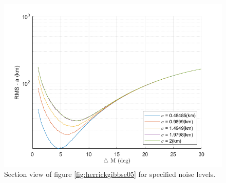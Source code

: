 \documentclass[12pt]{article}
\begin{document}
\begin{figure}[H]
	\centering
	\includegraphics[width=0.7\linewidth]{heck_gibbs_e_05_side}
	\caption{Section view of figure \ref{fig:herrickgibbse05} for specified noise levels.}
	\label{fig:heckgibbse05side}
\end{figure}
\end{document}
